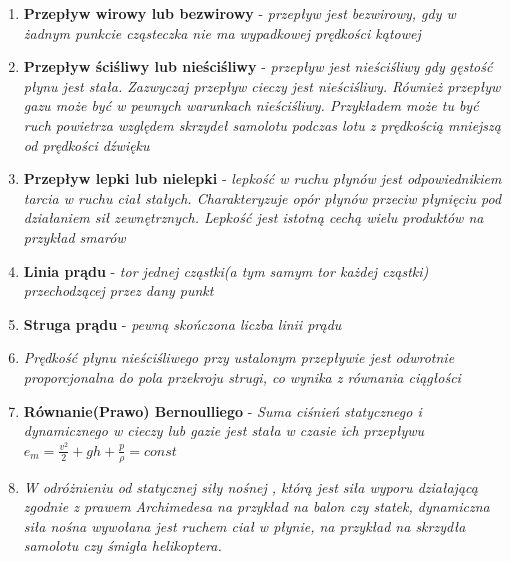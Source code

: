 \documentclass[12pt,twoside,a4paper]{book}
\begin{document}
\begin{enumerate}[label=(\alph*)]
\item\textbf{Przepływ wirowy lub bezwirowy} - \textit{przepływ jest bezwirowy, gdy
w żadnym punkcie cząsteczka nie ma wypadkowej prędkości kątowej}
\item\textbf{Przepływ ściśliwy lub nieściśliwy} - \textit{przepływ jest nieściśliwy gdy gęstość
płynu jest stała. Zazwyczaj przepływ cieczy jest nieściśliwy. Również przepływ gazu
może być w pewnych warunkach nieściśliwy. Przykładem może tu być ruch powietrza
względem skrzydeł samolotu podczas lotu z prędkością mniejszą od prędkości dźwięku}
\item\textbf{Przepływ lepki lub nielepki} - \textit{lepkość w ruchu płynów jest
odpowiednikiem tarcia w ruchu ciał stałych. Charakteryzuje opór płynów przeciw
płynięciu pod działaniem sił zewnętrznych. Lepkość jest istotną cechą wielu produktów
na przykład smarów}
\item\textbf{Linia prądu} - \textit{tor jednej cząstki(a tym samym tor każdej cząstki) przechodzącej przez dany punkt}
\item\textbf{Struga prądu} - \textit{pewną skończona liczba linii prądu}
\item\textit{Prędkość płynu nieściśliwego przy ustalonym przepływie jest odwrotnie
proporcjonalna do pola przekroju strugi, co wynika z równania ciągłości}
\item\textbf{Równanie(Prawo) Bernoulliego} - \textit{Suma ciśnień statycznego i dynamicznego w cieczy lub gazie jest stała w czasie ich przepływu \\ $e_m = \frac{v^2}{2} + gh + \frac{p}{\rho} = const$}
\item\textit{W odróżnieniu od statycznej siły nośnej , którą jest siła wyporu działającą zgodnie
z prawem Archimedesa na przykład na balon czy statek, dynamiczna siła nośna
wywołana jest ruchem ciał w płynie, na przykład na skrzydła samolotu czy śmigła
helikoptera.}
\end{enumerate}
\end{document}
